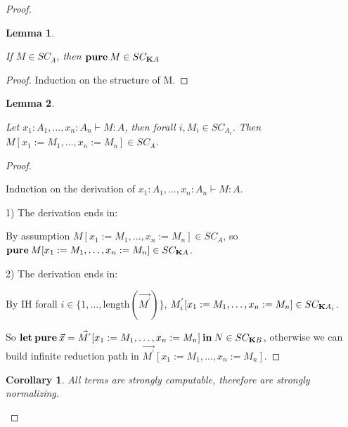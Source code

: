 \documentclass[a4paper]{article}
\newtheorem{lemma}{Lemma}
\newtheorem{col}{Corollary}
\begin{document}
\begin{proof}
\begin{lemma}
  $ $

  If $M \in SC_A$, then ${\bf pure \:} M \in SC_{{\bf K}A}$
\end{lemma}

\begin{proof}

  Induction on the structure of M.
\end{proof}

\begin{lemma}
  $ $

  Let $x_1 : A_1,\dots, x_n : A_n \vdash M : A$, then forall $i, M_i \in SC_{A_i}$. Then $M [x_1 := M_1,\dots,x_n := M_n] \in SC_A$.
\end{lemma}

\begin{proof}
  $ $

Induction on the derivation of $x_1 : A_1,\dots, x_n : A_n \vdash M : A$.

  1) The derivation ends in:

\begin{prooftree}
\end{prooftree}

  By assumption $M [x_1 := M_1,\dots,x_n := M_n] \in SC_A$, so ${\bf pure \:} M [x_1 := M_1,\dots,x_n := M_n] \in SC_{{\bf K}A}$.

\vspace{\baselineskip}

  2) The derivation ends in:
\begin{prooftree}
\end{prooftree}

By IH forall $i \in \{ 1,\dots,\text{length}(\vec{M^{'}}) \}$, $M_i^{'} [x_1 := M_1,\dots,x_n := M_n] \in SC_{{\bf K}A_i}$.

So ${\bf let \: pure \:} \vec{x} = \vec{M^{'}} [x_1 := M_1,\dots,x_n := M_n] {\: \bf in \:} N \in SC_{{\bf K} B}$,
otherwise we can build infinite reduction path in $\vec{M^{'}} [x_1 := M_1,\dots,x_n := M_n]$.
\end{proof}

\begin{col}

  All terms are strongly computable, therefore are strongly normalizing.
\end{col}

\end{proof}
\end{document}
